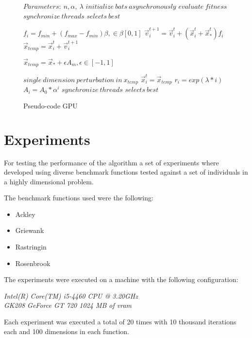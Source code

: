 \documentclass[conference]{IEEEtran}
\begin{document}
\begin{figure}
\begin{algorithmic}[1]
\State $Parameters:\ n,\alpha,\ \lambda$
\State $initialize\ bats\ asynchronously$
\State $evaluate\ fitness$
\State $synchronize\ threads$
\State $selects\ best$

        \State $f_i=f_{min} + (f_{max} - f_{min})\beta, \in \beta [0,1]$
        \State $\vec{v}_i^{t+1} = \vec{v}_i^{t} + (\vec{x}_i^{t} + \vec{x}_*^{t})f_i$
        \State $\vec{x}_{temp} = \vec{x}_i^{t} + \vec{v}_i^{t+1}$


            \State $\vec{x}_{temp} = \vec{x}_* + \epsilon A_m, \epsilon \in [-1, 1]$
        \EndIf

        \State $single\ dimension\ perturbation\ in\ x_{temp}$
            \State $\vec{x}_i^t = \vec{x}_{temp}$
            \State $r_i = exp(\lambda * i)$
            \State $A_i =  A_{0} * \alpha^i$
        \EndIf
        \State $synchronize\ threads$
        \State $selects\ best$
    \EndFor
\EndWhile
\end{algorithmic}
\caption{Pseudo-code GPU}\label{GPU}
\end{figure}

\section{Experiments}

For testing the performance of the algorithm a set of experiments where
developed using diverse benchmark functions tested against a set of
individuals in a highly dimensional problem.

The benchmark functions used were the following:

\begin{itemize}
    \item Ackley
    \item Griewank
    \item Rastringin
    \item Rosenbrook
\end{itemize}

The experiments were executed on a machine with the following configuration:

\textit{Intel(R) Core(TM) i5-4460  CPU @ 3.20GHz \\ GK208 GeForce GT 720 1024 MB of vram}

Each experiment was executed a total of 20 times with 10 thousand iterations each and 100 dimensions in each function.
\end{document}
